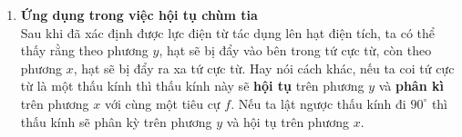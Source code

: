 \begin{enumerate}
    \item \textbf{Ứng dụng trong việc hội tụ chùm tia} \\
    Sau khi đã xác định được lực điện từ tác dụng lên hạt điện tích, ta có thể thấy rằng theo phương $y$, hạt sẽ bị đẩy vào bên trong tứ cực từ, còn theo phương $x$, hạt sẽ bị đẩy ra xa tứ cực từ. Hay nói cách khác, nếu ta coi tứ cực từ là một thấu kính thì thấu kính này sẽ \textbf{hội tụ} trên phương $y$ và \textbf{phân kì} trên phương $x$ với cùng một tiêu cự $f$. Nếu ta lật ngược thấu kính đi $90^\circ$ thì thấu kính sẽ phân kỳ trên phương $y$ và hội tụ trên phương $x$.
    
    \begin{figure}[!ht]
    \centering
\end{figure}
\end{enumerate}
